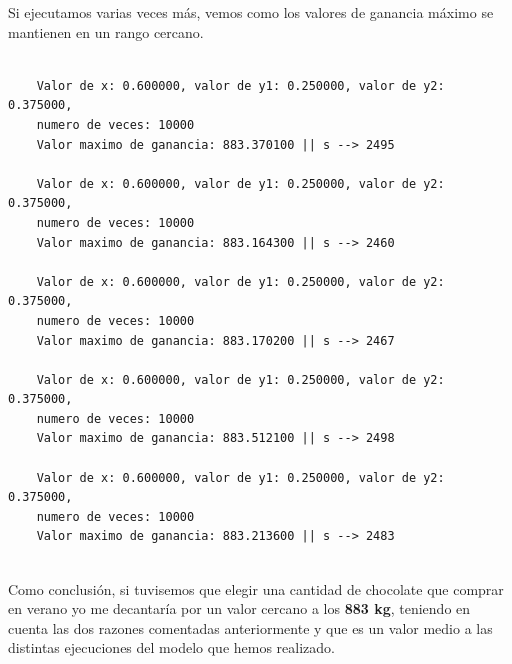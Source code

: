\documentclass[11pt,a4paper]{article}
\begin{document}
Si ejecutamos varias veces más, vemos como los valores de ganancia máximo se mantienen en un rango cercano.
\begin{lstlisting}

	Valor de x: 0.600000, valor de y1: 0.250000, valor de y2: 0.375000,
	numero de veces: 10000
	Valor maximo de ganancia: 883.370100 || s --> 2495

	Valor de x: 0.600000, valor de y1: 0.250000, valor de y2: 0.375000,
	numero de veces: 10000
	Valor maximo de ganancia: 883.164300 || s --> 2460

	Valor de x: 0.600000, valor de y1: 0.250000, valor de y2: 0.375000,
	numero de veces: 10000
	Valor maximo de ganancia: 883.170200 || s --> 2467
	
	Valor de x: 0.600000, valor de y1: 0.250000, valor de y2: 0.375000,
	numero de veces: 10000
	Valor maximo de ganancia: 883.512100 || s --> 2498

	Valor de x: 0.600000, valor de y1: 0.250000, valor de y2: 0.375000,
	numero de veces: 10000
	Valor maximo de ganancia: 883.213600 || s --> 2483
		
\end{lstlisting}

Como conclusión, si tuvisemos que elegir una cantidad de chocolate que comprar en verano yo me decantaría por un valor cercano a los \textbf{883 kg},
teniendo en cuenta las dos razones comentadas anteriormente y que es un valor medio a las distintas ejecuciones del modelo que hemos realizado.
\end{document}
